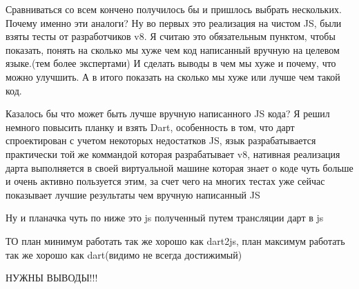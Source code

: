 Сравниваться со всем кончено получилось бы и пришлось выбрать нескольких.
Почему именно эти аналоги?
Ну во первых это реализация на чистом JS, были взяты тесты от разработчиков v8. Я считаю это обязательным пунктом, чтобы показать, понять на сколько мы хуже чем код написанный вручную на целевом языке.(тем более экспертами) И сделать выводы в чем мы хуже и почему, что можно улучшить. А в итого показать на сколько мы хуже или лучше чем такой код.

Казалось бы что может быть лучше вручную написанного JS кода? Я решил немного повысить планку и взять Dart, особенность в том, что дарт спроектирован с учетом некоторых недостатков JS, язык разрабатывается практически той же коммандой которая разрабатывает v8, нативная реализация дарта выполняется в своей виртуальной машине которая знает о коде чуть больше и очень активно пользуется этим, за счет чего на многих тестах уже сейчас показывает лучшие результаты чем вручную написанный JS

Ну и планачка чуть по ниже это js полученный путем трансляции дарт в js

ТО план минимум работать так же хорошо как dart2js, план максимум работать так же хорошо как dart(видимо не всегда достижимый)


НУЖНЫ ВЫВОДЫ!!!

